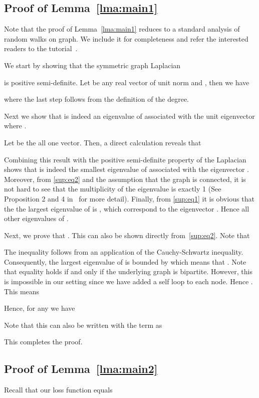 \documentclass{article} \usepackage{iclr2021_conference,times}
\begin{document}
\subsection{Proof of Lemma~\ref{lma:main1}}
Note that the proof of Lemma~\ref{lma:main1} reduces to a standard analysis of random walks on graph. We include it for completeness and refer the interested readers to the tutorial~\cite{von2007tutorial}.

We start by showing that the symmetric graph Laplacian

is positive semi-definite. Let  be any real vector of unit norm and , then we have

where the last step follows from the definition of the degree.

Next we show that  is indeed an eigenvalue of  associated with the unit eigenvector  where .

Let  be the all one vector. Then, a direct calculation reveals that

Combining this result with the positive semi-definite property of the Laplacian shows that  is indeed the smallest eigenvalue of  associated with the eigenvector . Moreover, from \eqref{sup:eq2} and the assumption that the graph is connected, it is not hard to see that the multiplicity of the eigenvalue  is exactly 1 (See Proposition 2 and 4 in~\cite{von2007tutorial} for more detail). Finally, from \eqref{sup:eq1} it is obvious that the the largest eigenvalue of  is , which correspond to the eigenvector . Hence all other eigenvalues of   .

Next, we prove that . This can also be shown directly from~\eqref{sup:eq2}. Note that

The inequality follows from an application of the Cauchy-Schwartz inequality. Consequently, the largest eigenvalue of  is bounded by  which means that . Note that equality holds if and only if the underlying graph is bipartite. However, this is impossible in our setting since we have added a self loop to each node. Hence . This means

Hence, for any  we have

Note that this can also be written with the  term as

This completes the proof.

\subsection{Proof of Lemma~\ref{lma:main2}}
Recall that our loss function equals
\end{document}
